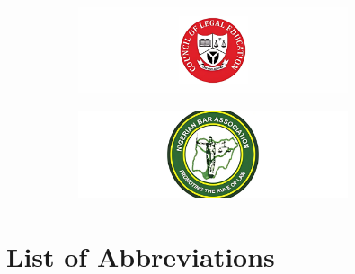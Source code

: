 \documentclass[
  letterpaper,
  DIV=11,
  numbers=noendperiod]{scrreprt}
\begin{document}
\begin{figure}
\begin{minipage}{0.50\linewidth}
\begin{figure}[H]
{\centering \includegraphics[width=3.125in,height=\textheight,keepaspectratio]{images/mous/cle.png}

}


\end{figure}%

\end{minipage}%
%
\begin{minipage}{0.50\linewidth}

\begin{figure}[H]

{\centering \includegraphics[width=3.125in,height=1.04167in]{images/mous/nba.png}

}


\end{figure}%

\end{minipage}%
\newline
\begin{minipage}{0.50\linewidth}

\end{minipage}%
%
\begin{minipage}{0.50\linewidth}

\end{minipage}%

\end{figure}%

\chapter*{List of Abbreviations}\label{list-of-abbreviations}

\end{document}
